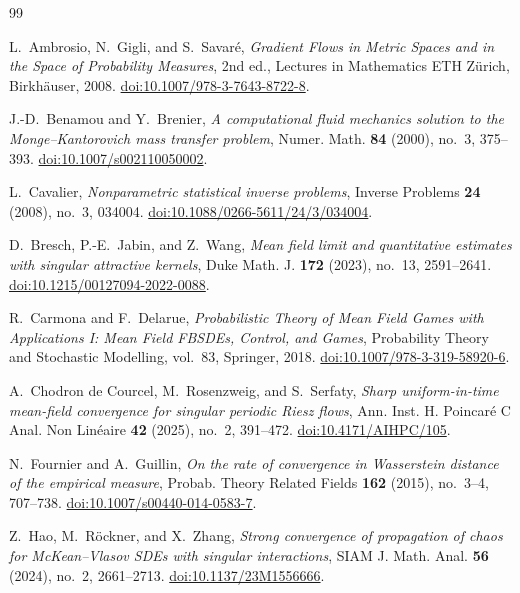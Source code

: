 \documentclass[11pt]{amsart}
\numberwithin{equation}{section}
\theoremstyle{plain}
\begin{document}
\begin{thebibliography}{99}

L.~Ambrosio, N.~Gigli, and S.~Savar\'e,
\emph{Gradient Flows in Metric Spaces and in the Space of Probability
Measures},
2nd ed., Lectures in Mathematics ETH Z\"urich, Birkh\"auser, 2008.
\href{https://doi.org/10.1007/978-3-7643-8722-8}
{doi:10.1007/978-3-7643-8722-8}.

J.-D.~Benamou and Y.~Brenier,
\emph{A computational fluid mechanics solution to the Monge--Kantorovich
mass transfer problem},
Numer. Math. \textbf{84} (2000), no.~3, 375--393.
\href{https://doi.org/10.1007/s002110050002}
{doi:10.1007/s002110050002}.

L.~Cavalier,
\emph{Nonparametric statistical inverse problems},
Inverse Problems \textbf{24} (2008), no.~3, 034004.
\href{https://doi.org/10.1088/0266-5611/24/3/034004}
{doi:10.1088/0266-5611/24/3/034004}.

D.~Bresch, P.-E.~Jabin, and Z.~Wang,
\emph{Mean field limit and quantitative estimates with singular attractive
kernels},
Duke Math. J. \textbf{172} (2023), no.~13, 2591--2641.
\href{https://doi.org/10.1215/00127094-2022-0088}
{doi:10.1215/00127094-2022-0088}.

R.~Carmona and F.~Delarue,
\emph{Probabilistic Theory of Mean Field Games with Applications I:
Mean Field FBSDEs, Control, and Games},
Probability Theory and Stochastic Modelling, vol.~83, Springer, 2018.
\href{https://doi.org/10.1007/978-3-319-58920-6}
{doi:10.1007/978-3-319-58920-6}.

A.~Chodron de Courcel, M.~Rosenzweig, and S.~Serfaty,
\emph{Sharp uniform-in-time mean-field convergence for singular periodic
Riesz flows},
Ann. Inst. H. Poincar\'e C Anal. Non Lin\'eaire
\textbf{42} (2025), no.~2, 391--472.
\href{https://doi.org/10.4171/AIHPC/105}{doi:10.4171/AIHPC/105}.

N.~Fournier and A.~Guillin,
\emph{On the rate of convergence in Wasserstein distance of the empirical
measure},
Probab. Theory Related Fields \textbf{162} (2015), no.~3--4, 707--738.
\href{https://doi.org/10.1007/s00440-014-0583-7}
{doi:10.1007/s00440-014-0583-7}.

Z.~Hao, M.~R\"ockner, and X.~Zhang,
\emph{Strong convergence of propagation of chaos for McKean--Vlasov SDEs
with singular interactions},
SIAM J. Math. Anal. \textbf{56} (2024), no.~2, 2661--2713.
\href{https://doi.org/10.1137/23M1556666}{doi:10.1137/23M1556666}.


\end{thebibliography}
\end{document}
